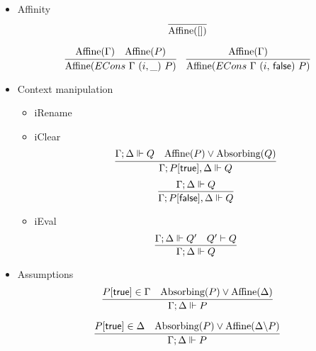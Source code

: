 \begin{itemize}

\item Affinity
  $$
  \infer{\Affine{[]}}{}
  $$

  \begin{equation*}
  \infer{\Affine{ECons\ \Gamma\ (i,\_)\ P}}
        {\Affine{\Gamma} &
         \Affine{P}
       }
  \quad
  \infer{\Affine{ECons\ \Gamma\ (i,\, \false)\ P}}
        {\Affine{\Gamma}}
  \end{equation*}
\item Context manipulation
  \begin{itemize}
  \item iRename
  \item iClear
    $$
    \infer{\entails {\IntuD} {P[\true], \SpatD} {Q}}
          {\entailsD Q &
           \Affine{P} \vee \Absorbing{Q}}
    $$
    $$
    \infer{\entails {\IntuD} {P[\false], \SpatD} {Q}}
          {\entailsD Q}
    $$
  \item iEval
    $$
    \infer{\entailsD Q}
          {\entailsD Q' &
           Q' \vdash Q
          }
    $$
  \end{itemize}
\item Assumptions
  $$
  \infer{\entailsD P}
        {P[\true] \in \IntuD &
         \Absorbing{P} \vee \Affine{\SpatD}}
  $$

 $$
  \infer{\entailsD P}
        {P[\true] \in \SpatD &
         \Absorbing{P} \vee \Affine{\SpatD \backslash P}}
 $$


\end{itemize}
